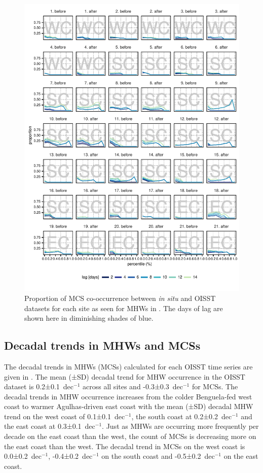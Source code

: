 \documentclass[a4paper,10pt,review]{elsarticle}
\begin{document}
\begin{figure}
\includegraphics[width=1.0\textwidth]{figure5.pdf}
\caption{Proportion of MCS co-occurrence between \emph{in situ} and OISST datasets for each site as seen for MHWs in . The days of lag are shown here in diminishing shades of blue.}
\label{fig:Figure5}
\end{figure}

\subsection{Decadal trends in MHWs and MCSs}
The decadal trends in MHWs (MCSs) calculated for each OISST time series are given in . The mean (±SD) decadal trend for MHW occurrence in the OISST dataset is 0.2±0.1~dec$^{-1}$ across all sites and -0.3±0.3~dec$^{-1}$ for MCSs. The decadal trends in MHW occurrence increases from the colder Benguela-fed west coast to warmer Agulhas-driven east coast with the mean (±SD) decadal MHW trend on the west coast of 0.1±0.1~dec$^{-1}$, the south coast at 0.2±0.2~dec$^{-1}$ and the east coast at 0.3±0.1~dec$^{-1}$. Just as MHWs are occurring more frequently per decade on the east coast than the west, the count of MCSs is decreasing more on the east coast than the west. The decadal trend in MCSs on the west coast is 0.0±0.2~dec$^{-1}$, -0.4±0.2~dec$^{-1}$ on the south coast and -0.5±0.2~dec$^{-1}$ on the east coast.
\end{document}
